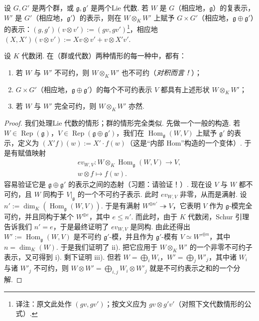 \begin{numpara}[积的表示]\label{np:ssl-2-1-9}
设 $G, G'$ 是两个群，或 $\mathfrak{g}, \mathfrak{g}'$ 是两个Lie 代数. 若 $W$ 是 $G$（相应地，$\mathfrak{g}$）的复表示，$W'$ 是 $G'$（相应地，$\mathfrak{g}'$）的表示，则在 $W \otimes_K W'$ 上赋予 $G \times G'$（相应地，$\mathfrak{g} \oplus \mathfrak{g}'$）的表示：$(g, g')(v \otimes v') := (gv, gv')$\footnote{译注：原文此处作 $(gv, gv')$；按文义应为 $gv \otimes g'v'$（对照下文代数情形的公式）.}，相应地 $(X, X')(v \otimes v') := Xv \otimes v' + v \otimes X'v'$.
\begin{proposition*}
设 $K$ 代数闭. 在（群或代数）两种情形的每一种中，都有：
\begin{enumerate}[label=\roman*)]
\item 若 $W$ 与 $W'$ 不可约，则 $W \otimes_K W'$ 也不可约（\emph{对积而言！}）；
\item $G \times G'$（相应地，$\mathfrak{g} \oplus \mathfrak{g}'$）的每个不可约表示 $V$ 都具有上述形状 $W \otimes_K W'$；
\item 若 $W$ 与 $W'$ 完全可约，则 $W \otimes_K W'$ 亦然.
\end{enumerate}
\end{proposition*}
\end{numpara}
\begin{proof}
我们处理Lie 代数的情形；群的情形完全类似. 先做一个一般的构造. 若 $W \in \operatorname{Rep}(\mathfrak{g})$，$V \in \operatorname{Rep}(\mathfrak{g} \oplus \mathfrak{g}')$，我们在 $\operatorname{Hom}_{\mathfrak{g}}(W, V)$ 上赋予 $\mathfrak{g}'$ 的表示，定义为 $(X'f)(w) := X' \cdot f(w)$（这是``内部 $\mathrm{Hom}$''构造的一个变体）. 于是有赋值映射
\[\begin{gathered}
ev_{W,V} : W \otimes_K \operatorname{Hom}_{\mathfrak{g}}(W, V) \longrightarrow V,\\
w \otimes f \longmapsto f(w).
\end{gathered}\]
容易验证它是 $\mathfrak{g} \oplus \mathfrak{g}'$ 的表示之间的态射（习题：请验证！）.
现在设 $V$ 与 $W$ 都不可约，且 $W$ 同构于 $V|_{\mathfrak{g}}$ 的一个不可约子表示. 此时 $ev_{W,V}$ 非零，从而是满射. 设 $n' := \dim_K(\operatorname{Hom}_{\mathfrak{g}}(W, V))$. 于是有满射 $W^{\oplus n'} \twoheadrightarrow V$，它表明 $V$ 作为 $\mathfrak{g}$-模完全可约，并且同构于某个 $W^{\oplus e}$，其中 $e \leqslant n'$. 而此时，由于 $K$ 代数闭，Schur 引理告诉我们 $n' = e$，于是最终证明了 $ev_{W,V}$ 是同构. 由此还得出 $W' := \operatorname{Hom}_{\mathfrak{g}}(W, V)$ 是不可约 $\mathfrak{g}'$-模，并且作为 $\mathfrak{g}'$-模有 $V \simeq W'^{\oplus n}$，其中 $n = \dim_K(W)$.
于是我们证明了 ii). 把它应用于 $W \otimes_K W'$ 的一个非零不可约子表示，又可得到 i).
剩下证明 iii). 但若 $W = \bigoplus_i W_i$，$W' = \bigoplus_j W'_j$，其中诸 $W_i$ 与诸 $W'_j$ 不可约，则 $W \otimes W' = \bigoplus_{i,j} W_i \otimes W'_j$ 就是不可约表示之和的一个分解.
\end{proof}

